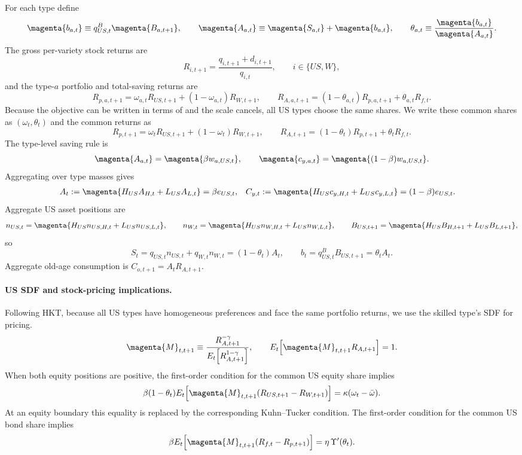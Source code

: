 \documentclass{article}
\def\green#1{#1}%
\begin{document}
For each type define
\[
\magenta{b_{a,t}}\equiv q^B_{US,t}\magenta{B_{a,t+1}},
\qquad
\magenta{A_{a,t}}\equiv \magenta{S_{a,t}}+\magenta{b_{a,t}},
\qquad
\theta_{a,t}\equiv\frac{\magenta{b_{a,t}}}{\magenta{A_{a,t}}}.
\]
The gross per-variety stock returns are
\[
R_{i,t+1}=\frac{q_{i,t+1}+d_{i,t+1}}{q_{i,t}},
\qquad i\in\{US,W\},
\]
and the type-$a$ portfolio and total-saving returns are
\[
R_{p,a,t+1}=\omega_{a,t}R_{US,t+1}+(1-\omega_{a,t})R_{W,t+1},
\qquad
R_{A,a,t+1}=(1-\theta_{a,t})R_{p,a,t+1}+\theta_{a,t}R_{f,t}.
\]
Because the objective can be written in terms of  and the scale  cancels, all US types choose the same shares. We write these common shares as $(\omega_t,\theta_t)$ and the common returns as
\[
R_{p,t+1}=\omega_tR_{US,t+1}+(1-\omega_t)R_{W,t+1},
\qquad
R_{A,t+1}=(1-\theta_t)R_{p,t+1}+\theta_tR_{f,t}.
\]
The type-level saving rule is
\[
\magenta{A_{a,t}}=\magenta{\beta w_{a,US,t}},
\qquad
\magenta{c_{y,a,t}}=\magenta{(1-\beta)w_{a,US,t}}.
\]
Aggregating over type masses gives
\begin{align}\label{US_saving_rule_bond_cost}
A_t&:=\magenta{H_{US}A_{H,t}+L_{US}A_{L,t}}=\beta e_{US,t},
&
C_{y,t}&:=\magenta{H_{US}c_{y,H,t}+L_{US}c_{y,L,t}}=(1-\beta)e_{US,t}.
\end{align}
Aggregate US asset positions are
\[
n_{US,t}=\magenta{H_{US}n_{US,H,t}+L_{US}n_{US,L,t}},
\qquad
n_{W,t}=\magenta{H_{US}n_{W,H,t}+L_{US}n_{W,L,t}},
\qquad
B_{US,t+1}=\magenta{H_{US}B_{H,t+1}+L_{US}B_{L,t+1}},
\]
so
\[
S_t=q_{US,t}n_{US,t}+q_{W,t}n_{W,t}=(1-\theta_t)A_t,
\qquad
b_t=q^B_{US,t}B_{US,t+1}=\theta_t A_t.
\]
Aggregate old-age consumption is $C_{o,t+1}=A_tR_{A,t+1}$.

\paragraph{US SDF and stock-pricing implications.}
Following HKT, because all US types have homogeneous preferences and face the same portfolio returns, we use the skilled type's SDF for pricing. 
\begin{equation}\label{US_K_def}
\magenta{M}_{t,t+1}
\equiv
\frac{R_{A,t+1}^{-\gamma}}{E_t\!\left[R_{A,t+1}^{1-\gamma}\right]},
\qquad
E_t\!\left[\magenta{M}_{t,t+1}R_{A,t+1}\right]=1.
\end{equation}
\green{When both equity positions are positive}, \green{the} first-order condition for the common US equity share implies
\begin{align}\label{US_omega_FOC_bond_cost}
\beta(1-\theta_t)
E_t\!\left[\magenta{M}_{t,t+1}(R_{US,t+1}-R_{W,t+1})\right]
=
\kappa(\omega_t-\bar\omega).
\end{align}
\green{At an equity boundary this equality is replaced by the corresponding Kuhn--Tucker condition}.
The first-order condition for the common US bond share implies
\begin{align}\label{US_theta_FOC_bond_cost}
\beta
E_t\!\left[\magenta{M}_{t,t+1}(R_{f,t}-R_{p,t+1})\right]
=
\eta\,\Upsilon'(\theta_t).
\end{align}
\end{document}
